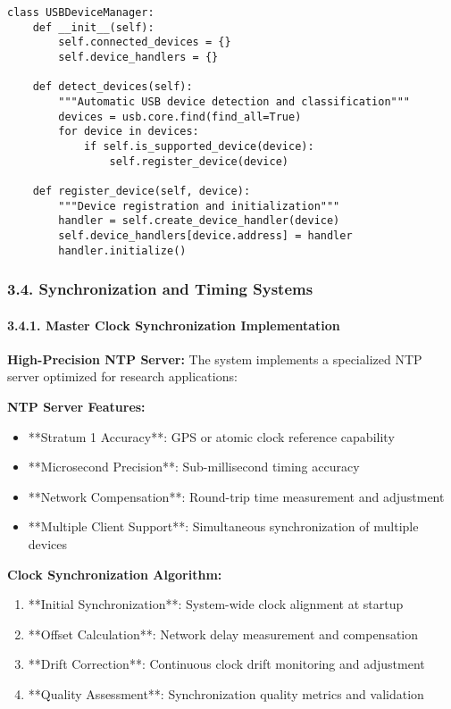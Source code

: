 \documentclass[11pt,a4paper]{article}
\begin{document}
\begin{verbatim}
class USBDeviceManager:
    def __init__(self):
        self.connected_devices = {}
        self.device_handlers = {}

    def detect_devices(self):
        """Automatic USB device detection and classification"""
        devices = usb.core.find(find_all=True)
        for device in devices:
            if self.is_supported_device(device):
                self.register_device(device)

    def register_device(self, device):
        """Device registration and initialization"""
        handler = self.create_device_handler(device)
        self.device_handlers[device.address] = handler
        handler.initialize()
\end{verbatim}

\subsubsection{3.4. Synchronization and Timing Systems}

\paragraph{3.4.1. Master Clock Synchronization Implementation}

\textbf{High-Precision NTP Server:}
The system implements a specialized NTP server optimized for research applications:

\textbf{NTP Server Features:}

\begin{itemize}
\item **Stratum 1 Accuracy**: GPS or atomic clock reference capability
\item **Microsecond Precision**: Sub-millisecond timing accuracy
\item **Network Compensation**: Round-trip time measurement and adjustment
\item **Multiple Client Support**: Simultaneous synchronization of multiple devices

\end{itemize}
\textbf{Clock Synchronization Algorithm:}

\begin{enumerate}
\item **Initial Synchronization**: System-wide clock alignment at startup
\item **Offset Calculation**: Network delay measurement and compensation
\item **Drift Correction**: Continuous clock drift monitoring and adjustment
\item **Quality Assessment**: Synchronization quality metrics and validation

\end{enumerate}
\end{document}
